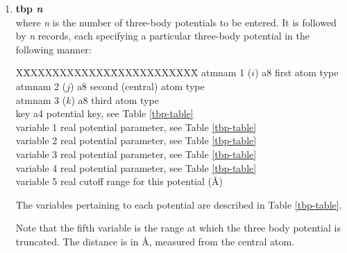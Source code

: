 \begin{enumerate}
\item {\bf tbp {\em n}} \\
where {\em n} is the number of three-body potentials to be
entered.  It is followed by {\em n} records, each specifying a
particular three-body potential in the following manner:
\begin{tabbing}
X\=XXXXXXXXXXXX\=XXXXXXXXXXXX\=\kill
\> atmnam 1 ($i$) \> a8   \> first atom type \\
\> atmnam 2 ($j$) \> a8   \> second (central) atom type \\
\> atmnam 3 ($k$) \> a8   \> third atom type \\
\> key            \> a4   \> potential key, see Table \ref{tbp-table} \\
\> variable 1     \> real \> potential parameter, see Table \ref{tbp-table} \\
\> variable 2     \> real \> potential parameter, see Table \ref{tbp-table} \\
\> variable 3     \> real \> potential parameter, see Table \ref{tbp-table} \\
\> variable 4     \> real \> potential parameter, see Table \ref{tbp-table} \\
\> variable 5     \> real \> cutoff range for this potential (\AA)
\end{tabbing}
The variables pertaining to each potential are described in Table
\ref{tbp-table}.

Note that the fifth variable is the range at which the three
body potential is truncated.  The
distance is in \AA, measured from the central atom.


\end{enumerate}
